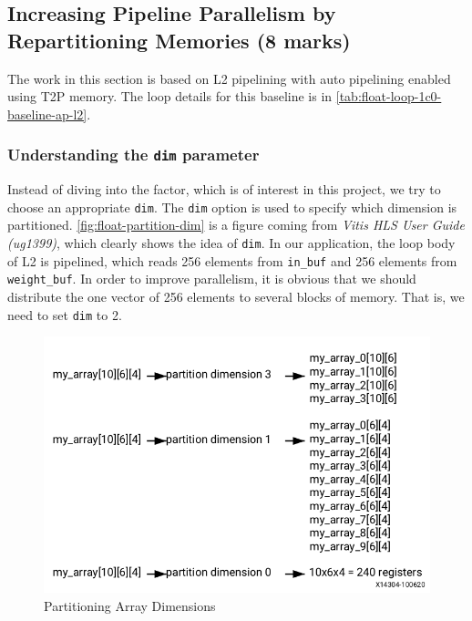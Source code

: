 \subsection{Increasing Pipeline Parallelism by Repartitioning Memories (8 marks)}\label{sec:1c}

The work in this section is based on L2 pipelining with auto pipelining enabled using T2P memory.
The loop details for this baseline is in \autoref{tab:float-loop-1c0-baseline-ap-l2}.

\subsubsection{Understanding the \texttt{dim} parameter}\label{sec:1cDim}

Instead of diving into the factor, which is of interest in this project,
we try to choose an appropriate \texttt{dim}.
The \texttt{dim} option is used to specify which dimension is partitioned.
\autoref{fig:float-partition-dim} is a figure coming from \textit{Vitis HLS User Guide (ug1399)}, which clearly shows the idea of \texttt{dim}.
In our application, the loop body of L2 is pipelined, which reads 256 elements from \texttt{in\_buf} and 256 elements from \texttt{weight\_buf}.
In order to improve parallelism, it is obvious that we should distribute the one vector of 256 elements to several blocks of memory.
That is, we need to set \texttt{dim} to 2.

\begin{figure}[ht!]
    \centering
    \includegraphics[scale=0.5]{images/float-partition-dim.png}
    \caption{Partitioning Array Dimensions}
    \label{fig:float-partition-dim}
\end{figure}

